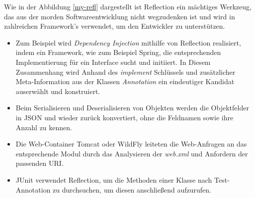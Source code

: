   Wie in der Abbildung \ref{my-refl} dargestellt ist Reflection ein mächtiges Werkzeug, das aus der morden Softwareentwicklung nicht wegzudenken ist und wird in zahlreichen Framework's verwendet, um den Entwickler zu unterstützen. 

  \begin{itemize}
    \item Zum Beispiel wird \textit{Dependency Injection} mithilfe von Reflection realisiert, indem ein Framework, wie zum Beispiel Spring, die entsprechenden Implementierung für ein Interface sucht und initiiert. In Diesem Zusammenhang wird Anhand des \textit{implement} Schlüssels und zusätzlicher Meta-Information aus der Klassen \textit{Annotation} ein eindeutiger Kandidat auserwählt und konstruiert.
    \item Beim Serialisieren und Deserialisieren von Objekten werden die Objektfelder in JSON und wieder zurück konvertiert, ohne die Feldnamen sowie ihre Anzahl zu kennen.
    \item Die Web-Container Tomcat oder WildFly leiteten die Web-Anfragen an das entsprechende Modul durch das Analysieren der \textit{web.xml} und Anfordern der passenden URI.
    \item JUnit verwendet Reflection, um die Methoden einer Klasse nach Test-Annotation zu durchsuchen, um diesen anschließend aufzurufen.
  \end{itemize}






